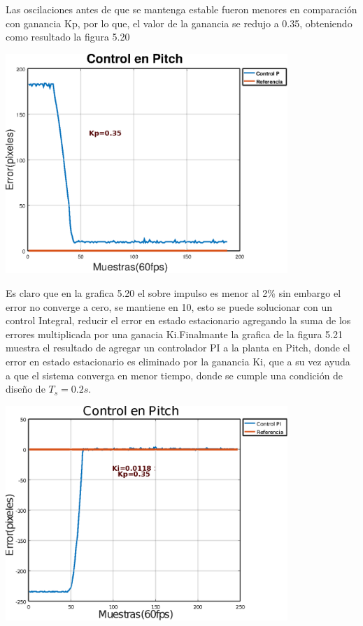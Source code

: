 Las oscilaciones antes de que se mantenga estable fueron menores en comparación con ganancia Kp, por lo que, el valor de la ganancia se 
redujo a 0.35, obteniendo como resultado la figura 5.20 
\begin{center}
	\includegraphics[width=0.8\textwidth]{Contenido/Cuerpo/Capitulo5/Fig27.eps}
	\label{Fig4}
\end{center}
Es claro que en la grafica 5.20 el sobre impulso es menor al 2\% sin embargo el error no converge a cero, se mantiene en 10, esto se 
puede solucionar con un control Integral, reducir el error en estado estacionario agregando la suma de los errores multiplicada por una ganacia 
Ki.Finalmante la grafica de la figura 5.21 muestra el resultado de agregar un controlador PI a la planta en Pitch, donde el error en estado 
estacionario es eliminado por la ganancia Ki, que a su vez ayuda a que el sistema converga en menor tiempo, donde se cumple una condición de diseño de $T_s = 0.2s$.
\begin{center}
	\includegraphics[width=0.8\textwidth]{Contenido/Cuerpo/Capitulo5/Fig28.eps}
	\label{Fig4}
\end{center}

